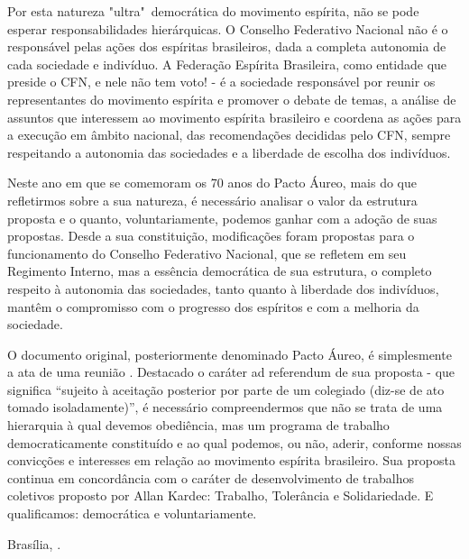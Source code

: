 Por esta natureza "ultra"\ democrática do movimento espírita, não se pode esperar responsabilidades hierárquicas. O Conselho Federativo Nacional não é o responsável pelas ações dos espíritas brasileiros, dada a completa autonomia de cada sociedade e indivíduo. A Federação Espírita Brasileira, como entidade que preside o CFN, e nele não tem voto! - é a sociedade responsável por reunir os representantes do movimento espírita e promover o debate de temas, a análise de assuntos que interessem ao movimento espírita brasileiro e coordena as ações para a execução em âmbito nacional, das recomendações decididas pelo CFN, sempre respeitando a autonomia das sociedades e a liberdade de escolha dos indivíduos. 

Neste ano em que se comemoram os 70 anos do Pacto Áureo, mais do que refletirmos sobre a sua natureza, é necessário analisar o valor da estrutura proposta e o quanto, voluntariamente, podemos ganhar com a adoção de suas propostas. Desde a sua constituição, modificações foram propostas para o funcionamento do Conselho Federativo Nacional, que se refletem em seu Regimento Interno, mas a essência democrática de sua estrutura, o completo respeito à autonomia das sociedades, tanto quanto  à liberdade dos indivíduos,  mantêm o compromisso com o progresso dos espíritos e com a melhoria da sociedade.

O documento original, posteriormente denominado Pacto Áureo, é simplesmente a ata de uma reunião \cite{pactoaureo}. Destacado o caráter ad referendum de sua proposta - que significa ``sujeito à aceitação posterior por parte de um colegiado (diz-se de ato tomado isoladamente)'', é necessário compreendermos que não se trata de uma hierarquia à qual devemos obediência, mas um programa de trabalho democraticamente constituído e ao qual podemos, ou não, aderir, conforme nossas convicções e interesses em relação ao movimento espírita brasileiro. Sua proposta continua em concordância com o caráter de desenvolvimento de trabalhos coletivos proposto por Allan Kardec: Trabalho, Tolerância e Solidariedade. E qualificamos: democrática e voluntariamente.  

\vspace{1,2cm}
\hspace{\fill} Brasília, \imprimirdata.